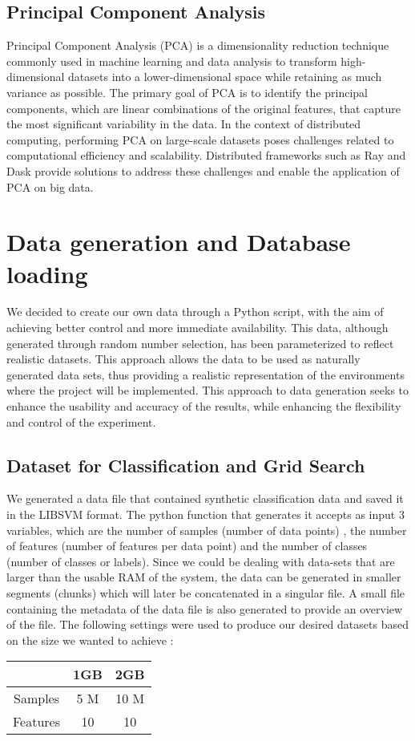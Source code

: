 \documentclass[conference]{IEEEtran}
\begin{document}
\subsection{Principal Component Analysis\cite{b12}}
Principal Component Analysis (PCA) is a dimensionality reduction technique commonly used in machine learning and data analysis to transform high-dimensional datasets into a lower-dimensional space while retaining as much variance as possible. The primary goal of PCA is to identify the principal components, which are linear combinations of the original features, that capture the most significant variability in the data. In the context of distributed computing, performing PCA on large-scale datasets poses challenges related to computational efficiency and scalability. Distributed frameworks such as Ray and Dask provide solutions to address these challenges and enable the application of PCA on big data.
\section{Data generation and Database loading}
We decided to create our own data through a Python script, with the aim of achieving better control and more immediate availability. This data, although generated through random number selection, has been parameterized to reflect realistic datasets. This approach allows the data to be used as naturally generated data sets, thus providing a realistic representation of the environments where the project will be implemented. This approach to data generation seeks to enhance the usability and accuracy of the results, while enhancing the flexibility and control of the experiment.

\subsection{Dataset for Classification and Grid Search}
We generated a data file that contained synthetic classification data and saved it in the LIBSVM format. The python function that generates it accepts as input 3 variables, which are the number of samples (number of data points) , the number of features (number of features per data point) and the number of classes (number of classes or labels). Since we could be dealing with data-sets that are larger than the usable RAM of the system, the data can be generated in smaller segments (chunks) which will later be concatenated in a singular file. A small file containing the metadata of the data file is also generated to provide an overview of the file. The following settings were used to produce our desired datasets based on the size we wanted to achieve :
 \begin{table}[ht]
    \centering
    \begin{tabular}{|c|c|c|}
    \hline
    ~ & 1GB & 2GB\\
    \hline
    Samples & 5 M & 10 M\\
    \hline
    Features & 10 & 10\\
    \hline
    \end{tabular}
\end{table}
\end{document}
